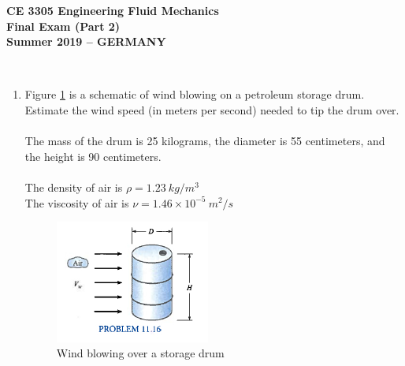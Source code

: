 \documentclass[12pt]{article}
\begin{document}
\begingroup
\begin{center}
{\textbf{{ CE 3305 Engineering Fluid Mechanics} \\ Final Exam (Part 2) \\ Summer 2019 -- GERMANY} }
\end{center}
\endgroup
\begingroup
~\newline

\begin{enumerate}
%


\item Figure \ref{fig:WindDrum} is a schematic of wind blowing on a petroleum storage drum.  Estimate the wind speed (in meters per second) needed to tip the drum over.  \\~\\ The mass of the drum is 25 kilograms, the diameter is 55 centimeters, and the height is 90 centimeters.  \\~\\The density of air is $\rho = 1.23~kg/m^3$  \\ The viscosity of air is $\nu = 1.46 \times 10^{-5}~m^2/s$
\begin{figure}[htbp] %
   \centering
   \includegraphics[width=2in]{WindDrum.jpg} 
   \caption{Wind blowing over a storage drum}
   \label{fig:WindDrum}
\end{figure}
\end{enumerate}
\end{document}
